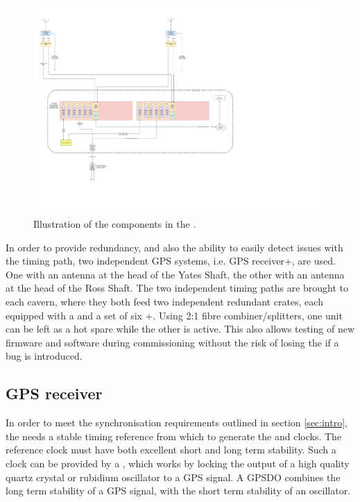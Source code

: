 \documentclass{article}
\begin{document}
\begin{figure}[h]
\includegraphics[width=\textwidth]{DUNE_SP_Timing_DAQ_on_CryoM_GPS_In_CUC_16mar20.pdf}
\caption{Illustration of the components in the .}
\label{fig:daq-readout-timing}
\end{figure}

In order to provide redundancy, and also the ability to easily detect
issues with the timing path, two independent GPS systems, i.e. GPS receiver+, are used. One with an antenna at the head of the Yates Shaft, the other with an
antenna at the head of the Ross Shaft. The two independent timing
paths are brought to each  cavern, where they both feed two independent redundant  crates, each equipped with a  and a set of six +. Using 2:1 fibre combiner/splitters, one  unit can be left as a hot spare while the
other is active. This also allows testing of new firmware and software
during commissioning without the risk of losing the  if a bug is
introduced.

\subsection{GPS receiver}
In order to meet the synchronisation requirements outlined in section \ref{sec:intro}, the  needs a stable timing reference from which to generate the  and  clocks. The reference clock must have both excellent short and long term stability. Such a clock can be provided by a , which works by locking the output of a high quality quartz crystal or rubidium oscillator to a GPS signal. A GPSDO combines the long term stability of a GPS signal, with the short term stability of an oscillator.
\end{document}
